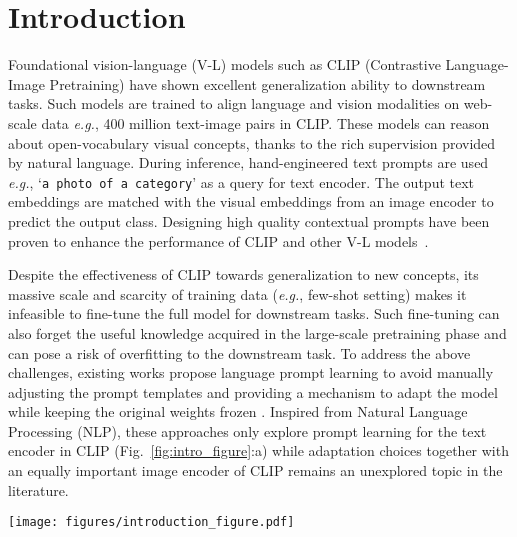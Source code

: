 \documentclass[10pt,twocolumn,letterpaper]{article}
\def\eg{\emph{e.g.}\xspace}
\begin{document}
\section{Introduction}
\label{sec:intro}
\noindent Foundational vision-language (V-L) models such as CLIP (Contrastive Language-Image Pretraining) \cite{radford2021learning} have shown excellent generalization ability to downstream tasks. Such models are trained to align language and vision modalities on web-scale data \eg, 400 million text-image pairs in CLIP. These models can reason about open-vocabulary visual concepts, thanks to the rich supervision provided by natural language. During inference, hand-engineered text prompts are used \eg, ‘\texttt{a photo of a category}’ as a query for text encoder. The output text embeddings are matched with the visual embeddings from an image encoder to predict the output class. Designing high quality contextual prompts have been proven to enhance the performance of CLIP and other V-L models~\cite{jin2021good, yao2021cpt}.

    Despite the effectiveness of CLIP towards generalization to new concepts, its massive scale {and scarcity of training data (\eg, few-shot setting)} makes it infeasible to fine-tune the full model for downstream tasks. Such fine-tuning can also forget the useful knowledge acquired in the large-scale pretraining phase and can pose a risk of overfitting to the downstream task. To address the above challenges, existing works propose language prompt learning to avoid manually adjusting the prompt templates and providing a mechanism to adapt the model while keeping the original weights frozen \cite{zhou2022conditional, zhou2022learning, lu2022prompt,huang2022unsupervised, shu2022tpt}. Inspired from Natural Language Processing (NLP), these approaches only explore prompt learning for the text encoder in CLIP (Fig.~\ref{fig:intro_figure}:a) {while adaptation choices together with an equally important image encoder of CLIP remains an unexplored topic in the literature.}

\begin{figure*}[!t]
\centering
{\texttt{[image: figures/introduction\_figure.pdf]}} \caption{\small Comparison of MaPLe with standard prompt learning methods. {\color{blue}\textbf{(a)}} Existing methods adopt uni-modal prompting techniques to fine-tune CLIP representations as prompts are learned only in a single branch of CLIP (language or vision). {\color{blue}\textbf{(b)}} MaPLe introduces branch-aware hierarchical prompts that adapt both language and vision branches simultaneously for improved generalization. {\color{blue}\textbf{(c)}} MaPLe surpasses state-of-the-art methods on 11 diverse image recognition datasets for novel class generalization task.}
\label{fig:intro_figure}
\end{figure*}
\end{document}
